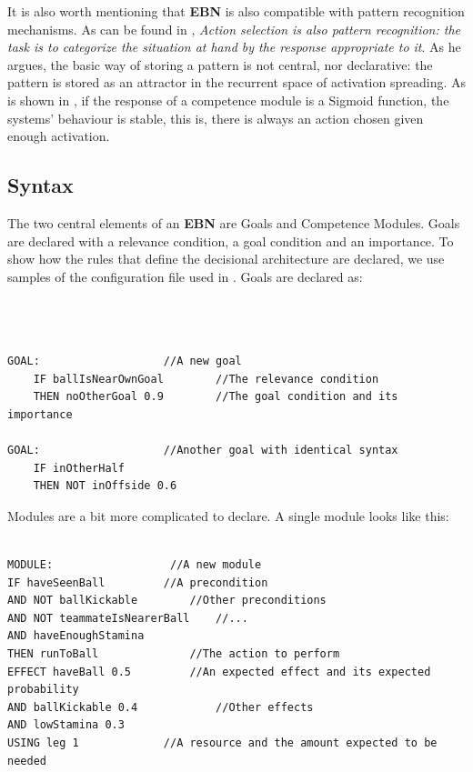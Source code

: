 \documentclass[
		twoside,openright,titlepage,numbers=noenddot,manychapters,
		headinclude,%
                footinclude=false,cleardoublepage=empty,
                BCOR=5mm,
		fontsize=11pt, %
                 enabledeprecatedfontcommands]{scrreprt}
\begin{document}
It is also worth mentioning that \textbf{EBN} is also compatible with pattern recognition mechanisms. As can be found in \cite[chapter 8]{goetz1998arb}, \emph{Action selection is also pattern recognition: the task is to categorize the situation at hand by the response appropriate to it}.  As he argues, the basic way of storing a pattern is not central, nor declarative: the pattern is stored as an attractor in the recurrent space of activation spreading. As is shown in \cite{goetz1998arb}, if the response of a competence module is a Sigmoid function, the systems' behaviour is stable, this is, there is always an action chosen given enough activation.

\subsection{Syntax}
The two central elements of an \textbf{EBN} are Goals and Competence Modules. Goals are declared with a relevance condition, a goal condition and an importance. To show how the rules that define the decisional architecture are declared, we use samples of the configuration file used in \cite{dorer2004ebn}. Goals are declared as:
\\
\\ \
\begin{lstlisting}

GOAL:					//A new goal 
	IF ballIsNearOwnGoal 		//The relevance condition
	THEN noOtherGoal 0.9		//The goal condition and its importance

GOAL: 					//Another goal with identical syntax
	IF inOtherHalf  			
	THEN NOT inOffside 0.6
\end{lstlisting}

Modules are a bit more complicated to declare. A single module looks like this:

\begin{lstlisting}

MODULE:					 //A new module
IF haveSeenBall			//A precondition
AND NOT ballKickable		//Other preconditions
AND NOT teammateIsNearerBall	//...
AND haveEnoughStamina
THEN runToBall  			//The action to perform
EFFECT haveBall 0.5 		//An expected effect and its expected probability 		
AND ballKickable 0.4    		//Other effects
AND lowStamina 0.3
USING leg 1				//A resource and the amount expected to be needed

\end{lstlisting}

\end{document}
